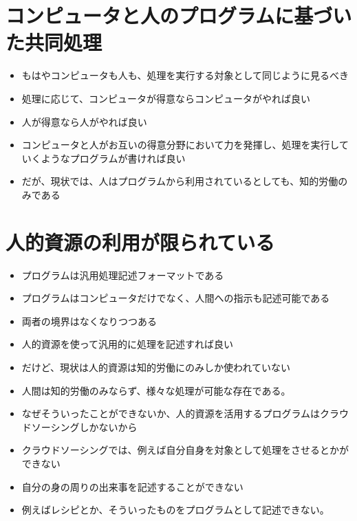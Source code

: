 \section{コンピュータと人のプログラムに基づいた共同処理}\label{ux30b3ux30f3ux30d4ux30e5ux30fcux30bfux3068ux4ebaux306eux30d7ux30edux30b0ux30e9ux30e0ux306bux57faux3065ux3044ux305fux5171ux540cux51e6ux7406}

\begin{itemize}
\itemsep1pt\parskip0pt
\item
  もはやコンピュータも人も、処理を実行する対象として同じように見るべき
\item
  処理に応じて、コンピュータが得意ならコンピュータがやれば良い
\item
  人が得意なら人がやれば良い
\item
  コンピュータと人がお互いの得意分野において力を発揮し、処理を実行していくようなプログラムが書ければ良い
\item
  だが、現状では、人はプログラムから利用されているとしても、知的労働のみである
\end{itemize}

\section{人的資源の利用が限られている}\label{ux4ebaux7684ux8cc7ux6e90ux306eux5229ux7528ux304cux9650ux3089ux308cux3066ux3044ux308b}

\begin{itemize}
\itemsep1pt\parskip0pt
\item
  プログラムは汎用処理記述フォーマットである
\item
  プログラムはコンピュータだけでなく、人間への指示も記述可能である
\item
  両者の境界はなくなりつつある
\item
  人的資源を使って汎用的に処理を記述すれば良い
\item
  だけど、現状は人的資源は知的労働にのみしか使われていない
\item
  人間は知的労働のみならず、様々な処理が可能な存在である。
\item
  なぜそういったことができないか、人的資源を活用するプログラムはクラウドソーシングしかないから
\item
  クラウドソーシングでは、例えば自分自身を対象として処理をさせるとかができない
\item
  自分の身の周りの出来事を記述することができない
\item
  例えばレシピとか、そういったものをプログラムとして記述できない。
\end{itemize}

